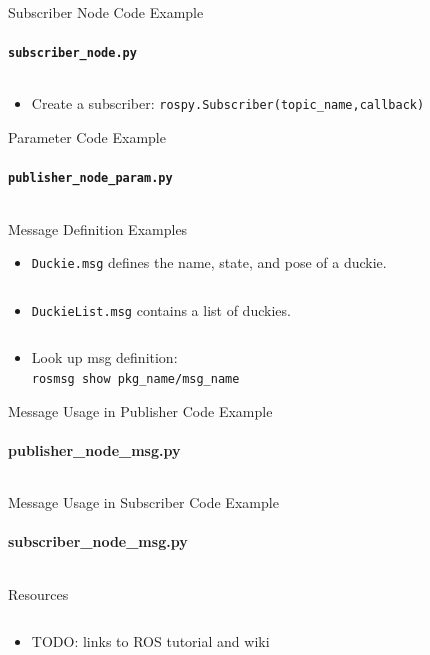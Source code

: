 \documentclass[aspectratio=43]{beamer}
\newcommand{\pyinline}[1]{\texttt{#1}}
\newcommand{\inline}[1]{\texttt{#1}}
\begin{document}
\begin{frame}{Subscriber Node Code Example}
	\framesubtitle{\texttt{subscriber\_node.py}}
	\inputminted{python}{snippet/subscriber_node.py}
	\begin{itemize}
		\item Create a subscriber: \pyinline{rospy.Subscriber(topic_name,callback)}
	\end{itemize}
\end{frame}

\begin{frame}{Parameter Code Example}
	\framesubtitle{\texttt{publisher\_node\_param.py}}
	\inputminted{python}{snippet/publisher_node_param.py}
\end{frame}

\begin{frame}{Message Definition Examples}
	\begin{itemize}
		\item \texttt{Duckie.msg} defines the name, state, and pose of a duckie.
		\inputminted{python}{snippet/Duckie.msg}
		\item \texttt{DuckieList.msg} contains a list of duckies.
		\inputminted{python}{snippet/DuckieList.msg}
		\item Look up msg definition:\\\inline{rosmsg show pkg_name/msg_name}
	\end{itemize}
\end{frame}

\begin{frame}{Message Usage in Publisher Code Example}
	\framesubtitle{publisher\_node\_msg.py}
	\inputminted{python}{snippet/publisher_node_msg.py}
\end{frame}

\begin{frame}{Message Usage in Subscriber Code Example}
	\framesubtitle{subscriber\_node\_msg.py}
	\inputminted{python}{snippet/subscriber_node_msg.py}
\end{frame}


\begin{frame}{Resources}
  \begin{columns}
	\begin{column}{0.6\textwidth}
	  \begin{itemize}
		\item TODO: links to ROS tutorial and wiki
	  \end{itemize}
	\end{column}
  \begin{column}{0.4\textwidth}
		\centering
	\end{column}
  \end{columns}
\end{frame}
\end{document}
